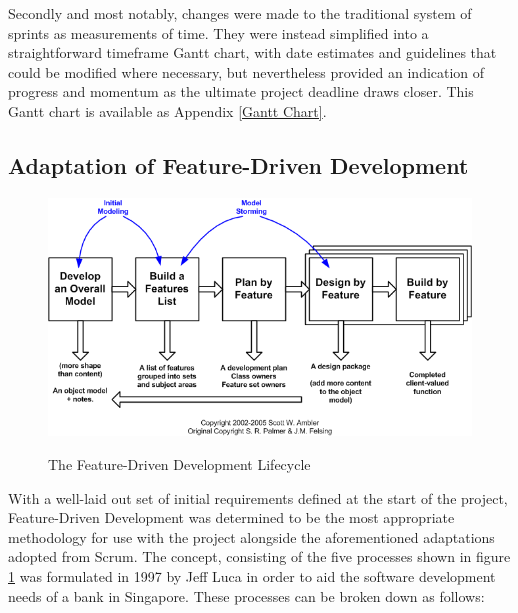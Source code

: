 Secondly and most notably, changes were made to the traditional system of sprints as measurements of time. They were instead simplified into a straightforward timeframe Gantt chart, with date estimates and guidelines that could be modified where necessary, but nevertheless provided an indication of progress and momentum as the ultimate project deadline draws closer. This Gantt chart is available as Appendix \ref{Gantt Chart}.

\subsection{Adaptation of Feature-Driven Development}
\begin{figure}[h]
    \includegraphics[width=\textwidth]{Figures/fdd}
    \caption{The Feature-Driven Development Lifecycle}
    \label{fig:fdd1} \cite{FDDimage}
\end{figure}

With a well-laid out set of initial requirements defined at the start of the project, Feature-Driven Development was determined to be the most appropriate methodology for use with the project alongside the aforementioned adaptations adopted from Scrum. The concept, consisting of the five processes shown in figure \ref{fig:fdd1} was formulated in 1997 by Jeff Luca in order to aid the software development needs of a bank in Singapore. \cite{Arrk1} These processes can be broken down as follows:

